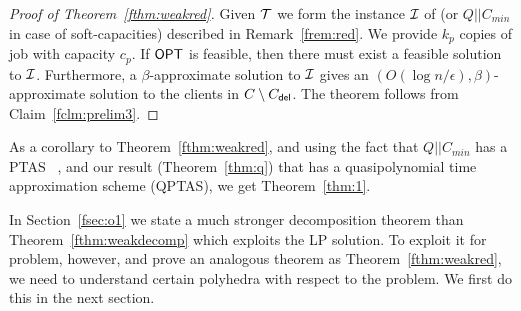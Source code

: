 \begin{proof}[Proof of Theorem~\ref{fthm:weakred}]
	Given ${\cal T}$ we form the instance ${\cal I}$  of \cckp (or $Q||C_{min}$ in case of soft-capacities) described in Remark~\ref{frem:red}. We provide $k_p$ copies of job with capacity $c_p$. If $\mathsf{OPT}$ is feasible, then there must exist a feasible solution to ${\cal I}$. Furthermore, a $\beta$-approximate solution to ${\cal I}$ gives an $\left(O(\log n/\epsilon),\beta\right)$-approximate solution to the clients in $C\setminus C_{\mathsf{del}}$. The theorem follows from Claim~\ref{fclm:prelim3}.
%	
\end{proof}

As a corollary to Theorem~\ref{fthm:weakred}, and using the fact that $Q||C_{min}$ has a PTAS ~\cite{AzarE98},  and our result (Theorem~\ref{thm:q}) that \cckp has a quasipolynomial time approximation scheme (QPTAS), we get Theorem~\ref{thm:1}.\medskip


In Section~\ref{fsec:o1} we state a much stronger decomposition theorem than Theorem~\ref{fthm:weakdecomp} which exploits the LP solution.
To exploit it for \mckc problem, however, and prove an analogous theorem as Theorem~\ref{fthm:weakred}, we need to understand certain polyhedra with respect to the \cckp problem.
We first do this in the next section.

